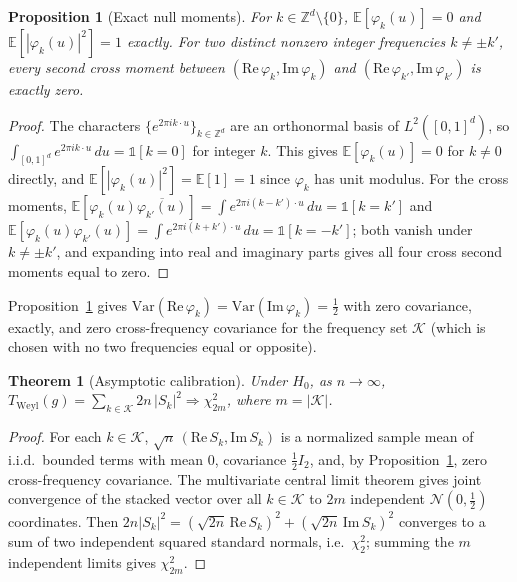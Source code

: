 \documentclass[11pt]{article}
\newtheorem{theorem}{Theorem}
\newtheorem{proposition}{Proposition}
\begin{document}
\begin{proposition}[Exact null moments]
\label{prop:weyl-moments}
For $k \in \mathbb{Z}^d \setminus\{0\}$, $\mathbb{E}[\varphi_k(u)] = 0$ and $\mathbb{E}[|\varphi_k(u)|^2] = 1$ exactly. For two distinct nonzero integer frequencies $k \neq \pm k'$, every second cross moment between $(\mathrm{Re}\,\varphi_k, \mathrm{Im}\,\varphi_k)$ and $(\mathrm{Re}\,\varphi_{k'}, \mathrm{Im}\,\varphi_{k'})$ is exactly zero.
\end{proposition}
\begin{proof}
The characters $\{e^{2\pi i k \cdot u}\}_{k \in \mathbb{Z}^d}$ are an orthonormal basis of $L^2([0,1]^d)$, so $\int_{[0,1]^d} e^{2\pi i k\cdot u}\,du = \mathbb{1}[k=0]$ for integer $k$. This gives $\mathbb{E}[\varphi_k(u)]=0$ for $k\neq 0$ directly, and $\mathbb{E}[|\varphi_k(u)|^2]=\mathbb{E}[1]=1$ since $\varphi_k$ has unit modulus. For the cross moments, $\mathbb{E}[\varphi_k(u)\overline{\varphi_{k'}(u)}] = \int e^{2\pi i(k-k')\cdot u}\,du = \mathbb{1}[k=k']$ and $\mathbb{E}[\varphi_k(u)\varphi_{k'}(u)] = \int e^{2\pi i(k+k')\cdot u}\,du = \mathbb{1}[k=-k']$; both vanish under $k \neq \pm k'$, and expanding into real and imaginary parts gives all four cross second moments equal to zero.
\end{proof}

Proposition~\ref{prop:weyl-moments} gives $\mathrm{Var}(\mathrm{Re}\,\varphi_k)=\mathrm{Var}(\mathrm{Im}\,\varphi_k)=\tfrac12$ with zero covariance, exactly, and zero cross-frequency covariance for the frequency set $\mathcal{K}$ (which is chosen with no two frequencies equal or opposite).

\begin{theorem}[Asymptotic calibration]
\label{thm:weyl-chisq}
Under $H_0$, as $n \to \infty$, $T_{\mathrm{Weyl}}(g) = \sum_{k \in \mathcal{K}} 2n\,|S_k|^2 \Rightarrow \chi^2_{2m}$, where $m = |\mathcal{K}|$.
\end{theorem}
\begin{proof}
For each $k \in \mathcal{K}$, $\sqrt{n}\,(\mathrm{Re}\,S_k, \mathrm{Im}\,S_k)$ is a normalized sample mean of i.i.d.\ bounded terms with mean $0$, covariance $\tfrac12 I_2$, and, by Proposition~\ref{prop:weyl-moments}, zero cross-frequency covariance. The multivariate central limit theorem gives joint convergence of the stacked vector over all $k \in \mathcal{K}$ to $2m$ independent $\mathcal{N}(0,\tfrac12)$ coordinates. Then $2n|S_k|^2 = (\sqrt{2n}\,\mathrm{Re}\,S_k)^2 + (\sqrt{2n}\,\mathrm{Im}\,S_k)^2$ converges to a sum of two independent squared standard normals, i.e.\ $\chi^2_2$; summing the $m$ independent limits gives $\chi^2_{2m}$.
\end{proof}
\end{document}
